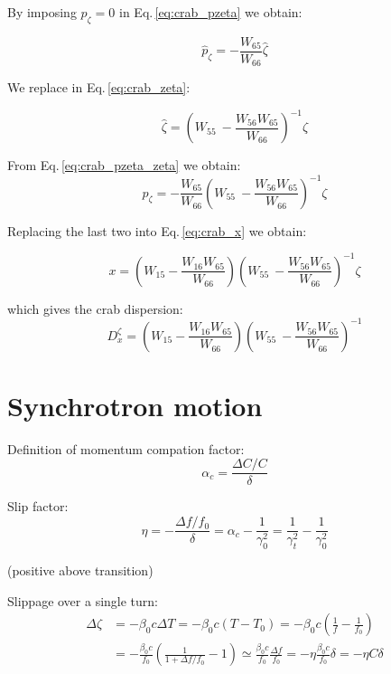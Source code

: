 By imposing $p_\zeta = 0$ in Eq.\,\ref{eq:crab_pzeta} we obtain:

\begin{equation}
\hat{p}_\zeta = - \frac{W_{65}}{W_{66}}\hat{\zeta}
\label{eq:crab_pzeta_zeta}
\end{equation}

We replace in Eq.\,\ref{eq:crab_zeta}:

\begin{equation}
\hat{\zeta} = \left( W_{55}\ -  \frac{W_{56}W_{65}}{W_{66}} \right)^{-1}\zeta
\end{equation}

From Eq.\,\ref{eq:crab_pzeta_zeta} we obtain:
\begin{equation}
\hat{p}_\zeta = - \frac{W_{65}}{W_{66}}\left( W_{55}\ -  \frac{W_{56}W_{65}}{W_{66}} \right)^{-1} \zeta
\end{equation}

Replacing the last two into Eq.\,\ref{eq:crab_x} we obtain:

\begin{equation}
x = \left(W_{15} -\frac{W_{16}W_{65}}{W_{66}}\right)\left( W_{55}\ -  \frac{W_{56}W_{65}}{W_{66}} \right)^{-1} \zeta
\end{equation}

which gives the crab dispersion:
\begin{equation}
D_x^\zeta = \left(W_{15} -\frac{W_{16}W_{65}}{W_{66}}\right)\left( W_{55}\ -  \frac{W_{56}W_{65}}{W_{66}} \right)^{-1}
\end{equation}

\section{Synchrotron motion}

Definition of momentum compation factor:
\begin{equation}
\alpha_c = 
\frac{\Delta C/C}\delta
\end{equation}

Slip factor:
\begin{equation}
\eta = -\frac{\Delta f/f_0}{\delta} = \alpha_c - \frac{1}{\gamma_0^2}
= \frac{1}{\gamma_t^2}- \frac{1}{\gamma_0^2}
\end{equation}

(positive above transition)

Slippage over a single turn:
\begin{align}
\Delta \zeta 
& = -\beta_0 c \Delta T 
= -\beta_0 c (T - T_0) 
= -\beta_0 c \left(\frac{1}{f} - \frac{1}{f_0}\right) \\
&= -\frac{\beta_0 c}{f_0} \left(\frac{1}{1 + {\Delta f}/{f_0}} - 1\right)
\simeq \frac{\beta_0 c}{f_0}\frac{\Delta f}{f_0}
= -\eta \frac{\beta_0 c}{f_0}\delta
= -\eta C \delta
\end{align}

